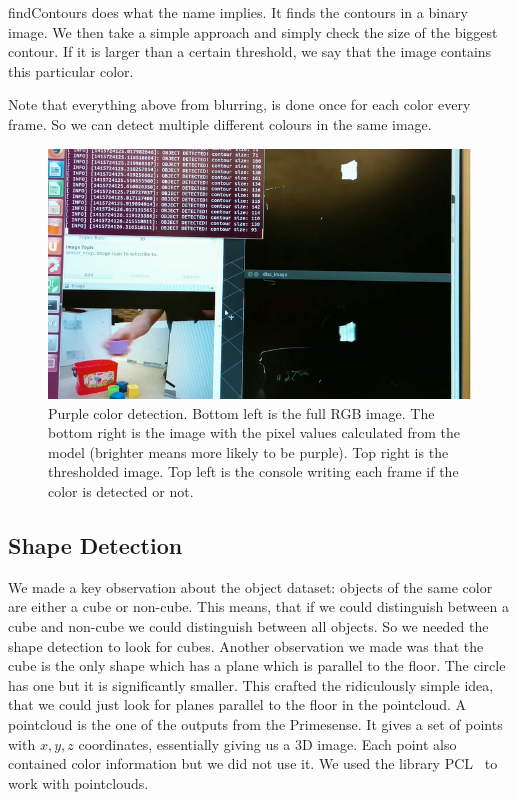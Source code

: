 \documentclass[10pt,a4paper,twocolumn]{article}
\begin{document}
findContours does what the name implies. It finds the contours in a binary
image. We then take a simple approach and simply check the size of the biggest
contour. If it is larger than a certain threshold, we say that the image
contains this particular color.

Note that everything above from blurring, is done once for each color every
frame. So we can detect multiple different colours in the same image.

\begin{figure}
  \centering
  \includegraphics[width=\linewidth]{images/purpdetect.png}
  \caption{Purple color detection. Bottom left is the full RGB image. The bottom
    right is the image with the pixel values calculated from the model (brighter
    means more likely to be purple). Top right is the thresholded image. Top
    left is the console writing each frame if the color is detected or not.}
  \label{fig:purpledetect}
\end{figure}
\subsection{Shape Detection}
We made a key observation about the object dataset: objects of the same color
are either a cube or non-cube. This means, that if we could distinguish between
a cube and non-cube we could distinguish between all objects. So we needed the
shape detection to look for cubes. Another observation we made was that the cube
is the only shape which has a plane which is parallel to the floor. The circle
has one but it is significantly smaller. This crafted the ridiculously simple
idea, that we could just look for planes parallel to the floor in the
pointcloud. A pointcloud is the one of the outputs from the Primesense. It gives
a set of points with $x,y,z$ coordinates, essentially giving us a 3D image. Each
point also contained color information but we did not use it. We used the
library PCL~\cite{pclorg} to work with pointclouds.
\end{document}
